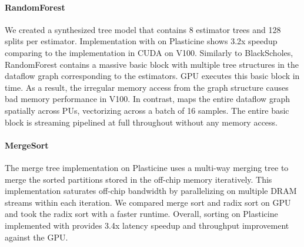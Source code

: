 \paragraph{RandomForest} We created a synthesized tree model that contains 8 estimator trees and 128 splits per estimator. 
Implementation with \name{} on Plasticine shows 3.2x speedup comparing to the implementation in CUDA on V100. 
Similarly to BlackScholes, RandomForest contains a massive basic block with multiple tree
structures in the dataflow graph corresponding to the estimators.
GPU executes this basic block in time. 
As a result, the irregular memory access from the graph structure causes bad memory performance in V100.
In contrast, \name{} maps the entire dataflow graph spatially across PUs, vectorizing across a batch of 16 samples.
The entire basic block is streaming pipelined at full throughout without any memory access.

\paragraph{MergeSort} 
The merge tree implementation on Plasticine uses a multi-way merging tree to merge the sorted
partitions stored in the off-chip memory iteratively.
This implementation saturates off-chip bandwidth by parallelizing on multiple DRAM streams within
each iteration.
We compared merge sort and radix sort on GPU and took the radix sort with a faster runtime.
Overall, sorting on Plasticine implemented with \name provides 3.4x latency speedup and throughput
improvement against the GPU.

